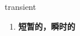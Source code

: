 
\begin{frame}
{\huge transient}
\begin{center}
\begin{enumerate}\Large
  \item \textbf{短暂的，瞬时的}
\end{enumerate}
\end{center}
\end{frame}

